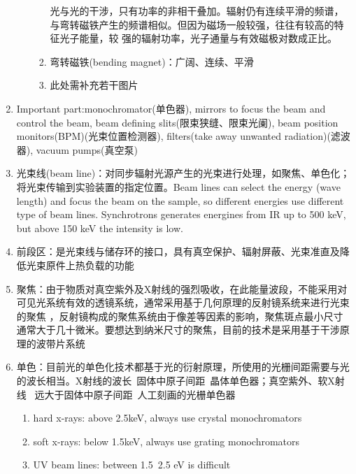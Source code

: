 \documentclass[12pt,a4paper]{article}
\begin{document}
\begin{enumerate}
\begin{enumerate}
\begin{enumerate}
                                光与光的干涉，只有功率的非相干叠加。辐射仍有连续平滑的频谱，与弯转磁铁产生的频谱相似。但因为磁场一般较强，往往有较高的特征光子能量，较
                                强的辐射功率，光子通量与有效磁极对数成正比。
                            \item 弯转磁铁(bending magnet)：广阔、连续、平滑
                            \item 此处需补充若干图片
                        \end{enumerate}
                \end{enumerate}
            \item Important part:monochromator(单色器), mirrors to focus the beam and control the beam, beam defining slits(限束狭缝、限束光阑), 
                beam position monitors(BPM)(光束位置检测器), filters(take away unwanted radiation)(滤波器), vacuum pumps(真空泵)
            \item 光束线(beam line)：对同步辐射光源产生的光束进行处理，如聚焦、单色化；将光束传输到实验装置的指定位置。Beam lines can select the 
                energy (wave length) and focus the beam on the sample, so different energies use different type of beam lines. Synchrotrons 
                generates energines from IR up to 500 keV, but above 150 keV the intensity is low.
            \item 前段区：是光束线与储存环的接口，具有真空保护、辐射屏蔽、光束准直及降低光束原件上热负载的功能
            \item 聚焦：由于物质对真空紫外及X射线的强烈吸收，在此能量波段，不能采用对可见光系统有效的透镜系统，通常采用基于几何原理的反射镜系统来进行光束的聚焦
                ，反射镜构成的聚焦系统由于像差等因素的影响，聚焦斑点最小尺寸通常大于几十微米。要想达到纳米尺寸的聚焦，目前的技术是采用基于干涉原理的波带片系统
            \item 单色：目前光的单色化技术都基于光的衍射原理，所使用的光栅间距需要与光的波长相当。X射线的波长~固体中原子间距~晶体单色器；真空紫外、软X射线~
                远大于固体中原子间距~人工刻画的光栅单色器
                \begin{enumerate}
                    \item hard x-rays: above 2.5keV, always use crystal monochromators
                    \item soft x-rays: below 1.5keV, always use grating monochromators
                    \item UV beam lines: between 1.5~2.5 eV is difficult
                \end{enumerate}

\end{enumerate}
\end{document}
